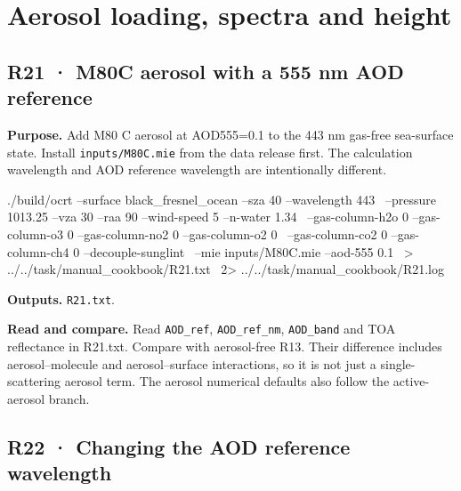 \section{Aerosol loading, spectra and height}
\label{sec:auto:09_cookbook:5}


\subsection{R21 · M80C aerosol with a 555 nm AOD reference}
\label{sec:auto:09_cookbook:5.1}

\label{recipe:R21}

\textbf{Purpose. }Add M80 C aerosol at AOD555=0.1 to the 443 nm gas-free sea-surface state. Install \texttt{inputs/\allowbreak{}M80C.mie} from the data release first. The calculation wavelength and AOD reference wavelength are intentionally different.

\noindent\begin{minipage}{\linewidth}
\begin{ManualCode}

./build/ocrt --surface black_fresnel_ocean --sza 40 --wavelength 443 \
  --pressure 1013.25 --vza 30 --raa 90 --wind-speed 5 --n-water 1.34 \
  --gas-column-h2o 0 --gas-column-o3 0 --gas-column-no2 0 --gas-column-o2 0 \
  --gas-column-co2 0 --gas-column-ch4 0 --decouple-sunglint \
  --mie inputs/M80C.mie --aod-555 0.1 \
  > ../../task/manual_cookbook/R21.txt \
  2> ../../task/manual_cookbook/R21.log

\end{ManualCode}
\end{minipage}\par

\textbf{Outputs. }\texttt{R21.txt}.

\textbf{Read and compare. }Read \texttt{AOD\_\allowbreak{}ref}, \texttt{AOD\_\allowbreak{}ref\_\allowbreak{}nm}, \texttt{AOD\_\allowbreak{}band} and TOA reflectance in R21.txt. Compare with aerosol-free R13. Their difference includes aerosol–molecule and aerosol–surface interactions, so it is not just a single-scattering aerosol term. The aerosol numerical defaults also follow the active-aerosol branch.


\subsection{R22 · Changing the AOD reference wavelength}
\label{sec:auto:09_cookbook:5.2}

